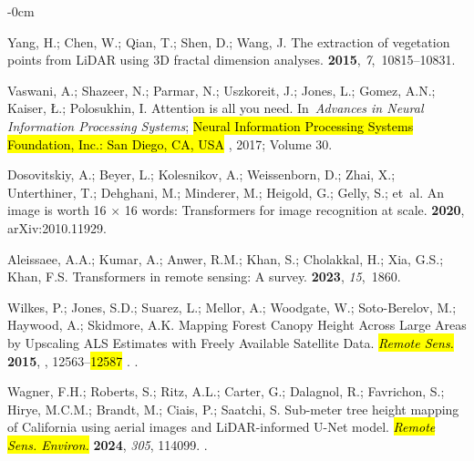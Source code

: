 \documentclass[remotesensing,article,accept,pdftex,moreauthors]{Definitions/mdpi}
\begin{document}
\begin{adjustwidth}{-\extralength}{0cm}
\begin{thebibliography}{999}
Yang, H.; Chen, W.; Qian, T.; Shen, D.; Wang, J.
\newblock The extraction of vegetation points from LiDAR using 3D fractal
  dimension analyses.
 {\bf 2015}, {\em 7},~10815--10831.

Vaswani, A.; Shazeer, N.; Parmar, N.; Uszkoreit, J.; Jones, L.; Gomez, A.N.;
  Kaiser, {\L}.; Polosukhin, I.
\newblock Attention is all you need.
\newblock In~{\em Advances in Neural Information Processing Systems}; \hl{Neural Information Processing Systems Foundation, Inc.: San Diego, CA, USA}%
, 2017; Volume 30.

Dosovitskiy, A.; Beyer, L.; Kolesnikov, A.; Weissenborn, D.; Zhai, X.;
  Unterthiner, T.; Dehghani, M.; Minderer, M.; Heigold, G.; Gelly, S.;  et~al.
\newblock An image is worth 16 $\times$ 16 words: Transformers for image recognition at
  scale.
 {\bf 2020}, arXiv:2010.11929.

Aleissaee, A.A.; Kumar, A.; Anwer, R.M.; Khan, S.; Cholakkal, H.; Xia, G.S.;
  Khan, F.S.
\newblock Transformers in remote sensing: A survey.
 {\bf 2023}, {\em 15},~1860.

Wilkes, P.; Jones, S.D.; Suarez, L.; Mellor, A.; Woodgate, W.; Soto-Berelov,
  M.; Haywood, A.; Skidmore, A.K.
\newblock Mapping Forest Canopy Height Across Large Areas by Upscaling {ALS}
  Estimates with Freely Available Satellite Data. \emph{\hl{Remote Sens.}%
} {\bf 2015},
, 12563--\hl{12587}%
.
.

Wagner, F.H.; Roberts, S.; Ritz, A.L.; Carter, G.; Dalagnol, R.; Favrichon, S.;
  Hirye, M.C.M.; Brandt, M.; Ciais, P.; Saatchi, S.
\newblock Sub-meter tree height mapping of California using aerial images and
  {LiDAR}-informed U-Net model. \emph{\hl{Remote Sens. Environ.}} {\bf 2024}, {\em 305}, 114099.
.


\end{thebibliography}
\end{adjustwidth}
\end{document}
